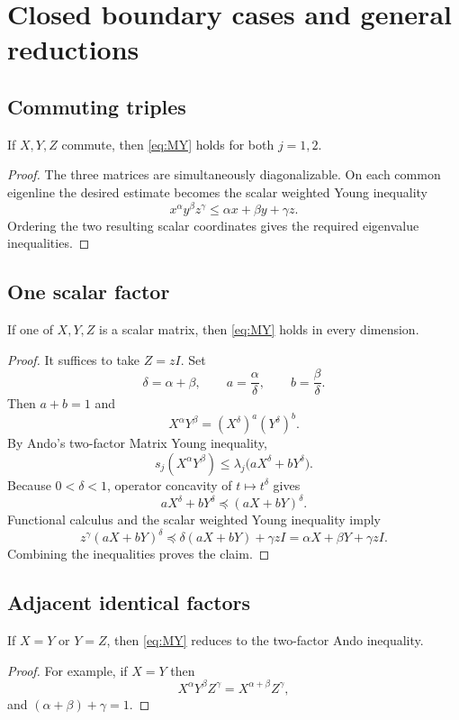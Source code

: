 \section{Closed boundary cases and general reductions}

\subsection{Commuting triples}
\begin{proposition}
If $X,Y,Z$ commute, then \eqref{eq:MY} holds for both $j=1,2$.
\end{proposition}
\begin{proof}
The three matrices are simultaneously diagonalizable.  On each common eigenline the desired estimate becomes the scalar weighted Young inequality
\[
x^\alpha y^\beta z^\gamma\le \alpha x+\beta y+\gamma z.
\]
Ordering the two resulting scalar coordinates gives the required eigenvalue inequalities.
\end{proof}

\subsection{One scalar factor}
\begin{proposition}
If one of $X,Y,Z$ is a scalar matrix, then \eqref{eq:MY} holds in every dimension.
\end{proposition}
\begin{proof}
It suffices to take $Z=zI$.  Set
\[
\delta=\alpha+\beta,\qquad a=\frac{\alpha}{\delta},\qquad b=\frac{\beta}{\delta}.
\]
Then $a+b=1$ and
\[
X^\alpha Y^\beta=(X^\delta)^a(Y^\delta)^b.
\]
By Ando's two-factor Matrix Young inequality,
\[
s_j(X^\alpha Y^\beta)
\le \lambda_j\bigl(aX^\delta+bY^\delta\bigr).
\]
Because $0<\delta<1$, operator concavity of $t\mapsto t^\delta$ gives
\[
aX^\delta+bY^\delta\preceq (aX+bY)^\delta.
\]
Functional calculus and the scalar weighted Young inequality imply
\[
z^\gamma(aX+bY)^\delta
\preceq \delta(aX+bY)+\gamma zI
=\alpha X+\beta Y+\gamma zI.
\]
Combining the inequalities proves the claim.
\end{proof}

\subsection{Adjacent identical factors}
\begin{proposition}
If $X=Y$ or $Y=Z$, then \eqref{eq:MY} reduces to the two-factor Ando inequality.
\end{proposition}
\begin{proof}
For example, if $X=Y$ then
\[
X^\alpha Y^\beta Z^\gamma=X^{\alpha+\beta}Z^\gamma,
\]
and $(\alpha+\beta)+\gamma=1$.
\end{proof}

